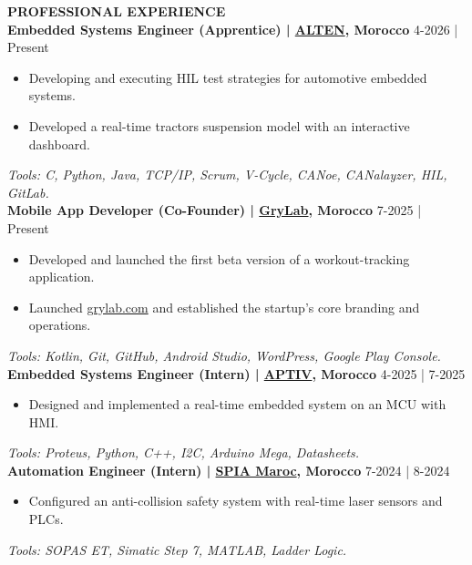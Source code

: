 \documentclass{article}
\begin{document}
\begin{minipage}[t]{0.66\textwidth}
\vspace{2em} 
{\color{sectionteal}\large\bfseries PROFESSIONAL EXPERIENCE} \\[0.1em]
\textbf{Embedded Systems Engineer (Apprentice) | \href{https://www.alten.com}{ALTEN}, Morocco} \hfill 4-2026 | Present \\[-1.15em]
\begin{itemize}[leftmargin=*, label={-}, itemsep=0.15em, topsep=0pt, parsep=0pt]
\item Developing and executing HIL test strategies for automotive embedded systems.
\item Developed a real-time tractors suspension model  with an interactive dashboard.
\end{itemize}
\textit{Tools: C, Python, Java, TCP/IP, Scrum, V-Cycle, CANoe, CANalayzer, HIL, GitLab.} \\[-0.3em]

\textbf{Mobile App Developer (Co-Founder) | \href{https://www.grylab.com}{GryLab}, Morocco} \hfill 7-2025 | Present \\[-1.15em]
\begin{itemize}[leftmargin=*, label={-}, itemsep=0.15em, topsep=0pt, parsep=0pt]
\item Developed and launched the first beta version of a workout-tracking application.
\item Launched \href{https://www.grylab.com}{grylab.com} and established the startup's core branding and operations.
\end{itemize}
\textit{Tools: Kotlin, Git, GitHub, Android Studio, WordPress, Google Play Console.} \\[-0.3em]

\textbf{Embedded Systems Engineer (Intern) | \href{https://www.aptiv.com}{APTIV}, Morocco} \hfill 4-2025 | 7-2025 \\[-1.15em]
\begin{itemize}[leftmargin=*, label={-}, itemsep=0.15em, topsep=0pt, parsep=0pt]
\item Designed and implemented a real-time embedded system on an MCU with HMI.
\end{itemize}
\textit{Tools: Proteus, Python, C++, I2C, Arduino Mega, Datasheets.} \\[-0.3em]

\textbf{Automation Engineer (Intern) | \href{https://www.spia.ma/}{SPIA Maroc}, Morocco} \hfill 7-2024 | 8-2024 \\[-1.15em]
\begin{itemize}[leftmargin=*, label={-}, itemsep=0.15em, topsep=0pt, parsep=0pt]
\item Configured an anti-collision safety system with real-time laser sensors and PLCs.
\end{itemize}
\textit{Tools: SOPAS ET, Simatic Step 7, MATLAB, Ladder Logic.}


\end{minipage}
\end{document}
